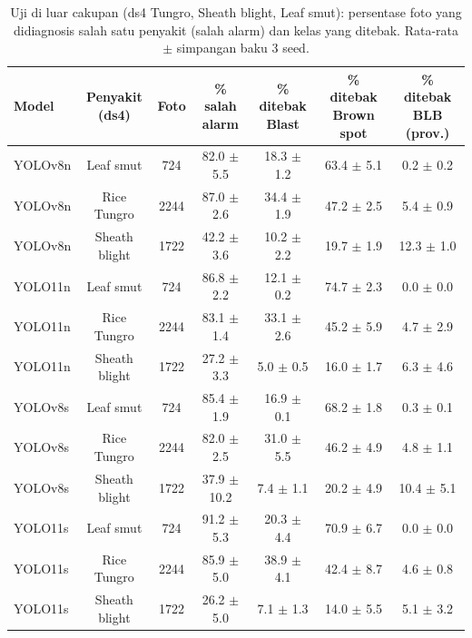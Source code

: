 \begin{table}[!t]
\centering
\caption{Uji di luar cakupan (ds4 Tungro, Sheath blight, Leaf smut): persentase foto yang didiagnosis salah satu penyakit (salah alarm) dan kelas yang ditebak. Rata-rata $\pm$ simpangan baku 3 seed.}
\label{tab:luar_cakupan}
\footnotesize
\begin{tabular}{lcccccc}
\hline
\textbf{Model} & \textbf{Penyakit (ds4)} & \textbf{Foto} & \textbf{\% salah alarm} & \textbf{\% ditebak Blast} & \textbf{\% ditebak Brown spot} & \textbf{\% ditebak BLB (prov.)} \\
\hline
YOLOv8n & Leaf smut & 724 & 82.0 $\pm$ 5.5 & 18.3 $\pm$ 1.2 & 63.4 $\pm$ 5.1 & 0.2 $\pm$ 0.2 \\
YOLOv8n & Rice Tungro & 2244 & 87.0 $\pm$ 2.6 & 34.4 $\pm$ 1.9 & 47.2 $\pm$ 2.5 & 5.4 $\pm$ 0.9 \\
YOLOv8n & Sheath blight & 1722 & 42.2 $\pm$ 3.6 & 10.2 $\pm$ 2.2 & 19.7 $\pm$ 1.9 & 12.3 $\pm$ 1.0 \\
YOLO11n & Leaf smut & 724 & 86.8 $\pm$ 2.2 & 12.1 $\pm$ 0.2 & 74.7 $\pm$ 2.3 & 0.0 $\pm$ 0.0 \\
YOLO11n & Rice Tungro & 2244 & 83.1 $\pm$ 1.4 & 33.1 $\pm$ 2.6 & 45.2 $\pm$ 5.9 & 4.7 $\pm$ 2.9 \\
YOLO11n & Sheath blight & 1722 & 27.2 $\pm$ 3.3 & 5.0 $\pm$ 0.5 & 16.0 $\pm$ 1.7 & 6.3 $\pm$ 4.6 \\
YOLOv8s & Leaf smut & 724 & 85.4 $\pm$ 1.9 & 16.9 $\pm$ 0.1 & 68.2 $\pm$ 1.8 & 0.3 $\pm$ 0.1 \\
YOLOv8s & Rice Tungro & 2244 & 82.0 $\pm$ 2.5 & 31.0 $\pm$ 5.5 & 46.2 $\pm$ 4.9 & 4.8 $\pm$ 1.1 \\
YOLOv8s & Sheath blight & 1722 & 37.9 $\pm$ 10.2 & 7.4 $\pm$ 1.1 & 20.2 $\pm$ 4.9 & 10.4 $\pm$ 5.1 \\
YOLO11s & Leaf smut & 724 & 91.2 $\pm$ 5.3 & 20.3 $\pm$ 4.4 & 70.9 $\pm$ 6.7 & 0.0 $\pm$ 0.0 \\
YOLO11s & Rice Tungro & 2244 & 85.9 $\pm$ 5.0 & 38.9 $\pm$ 4.1 & 42.4 $\pm$ 8.7 & 4.6 $\pm$ 0.8 \\
YOLO11s & Sheath blight & 1722 & 26.2 $\pm$ 5.0 & 7.1 $\pm$ 1.3 & 14.0 $\pm$ 5.5 & 5.1 $\pm$ 3.2 \\
\hline
\end{tabular}
\end{table}
